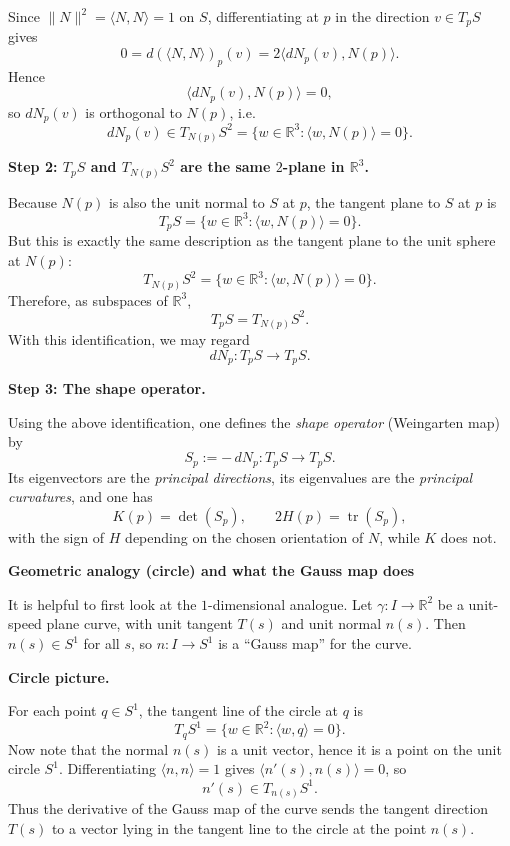 \begin{solution}
	Since $\|N\|^2=\langle N,N\rangle=1$ on $S$, differentiating at $p$ in the direction $v\in T_pS$
	gives
	\[
	0=d(\langle N,N\rangle)_p(v)=2\langle dN_p(v),N(p)\rangle.
	\]
	Hence
	\[
	\langle dN_p(v),N(p)\rangle=0,
	\]
	so $dN_p(v)$ is orthogonal to $N(p)$, i.e.
	\[
	dN_p(v)\in T_{N(p)}S^2=\{w\in\mathbb R^3:\langle w,N(p)\rangle=0\}.
	\]
	
	\par\medskip\noindent\textbf{Step 2: $T_pS$ and $T_{N(p)}S^2$ are the same $2$-plane in $\mathbb R^3$.}\par\smallskip

	Because $N(p)$ is also the unit normal to $S$ at $p$, the tangent plane to $S$ at $p$ is
	\[
	T_pS=\{w\in\mathbb R^3:\langle w,N(p)\rangle=0\}.
	\]
	But this is exactly the same description as the tangent plane to the unit sphere at $N(p)$:
	\[
	T_{N(p)}S^2=\{w\in\mathbb R^3:\langle w,N(p)\rangle=0\}.
	\]
	Therefore, as subspaces of $\mathbb R^3$,
	\[
	T_pS = T_{N(p)}S^2.
	\]
	With this identification, we may regard
	\[
	dN_p:T_pS\to T_pS.
	\]
	
	\par\medskip\noindent\textbf{Step 3: The shape operator.}\par\smallskip

	Using the above identification, one defines the \emph{shape operator} (Weingarten map) by
	\[
	S_p:=-\,dN_p:T_pS\to T_pS.
	\]
	Its eigenvectors are the \emph{principal directions}, its eigenvalues are the \emph{principal curvatures},
	and one has
	\[
	K(p)=\det(S_p),\qquad 2H(p)=\operatorname{tr}(S_p),
	\]
	with the sign of $H$ depending on the chosen orientation of $N$, while $K$ does not.
	
	\par\medskip\noindent\textbf{Geometric analogy (circle) and what the Gauss map does}\par\smallskip

	
	It is helpful to first look at the $1$-dimensional analogue.
	Let $\gamma:I\to\mathbb R^2$ be a unit-speed plane curve, with unit tangent $T(s)$ and unit normal $n(s)$.
	Then $n(s)\in S^1$ for all $s$, so $n:I\to S^1$ is a ``Gauss map'' for the curve.
	
	\par\medskip\noindent\textbf{Circle picture.}\par\smallskip

	For each point $q\in S^1$, the tangent line of the circle at $q$ is
	\[
	T_qS^1=\{w\in\mathbb R^2:\langle w,q\rangle=0\}.
	\]
	Now note that the normal $n(s)$ is a unit vector, hence it is a point on the unit circle $S^1$.
	Differentiating $\langle n,n\rangle=1$ gives $\langle n'(s),n(s)\rangle=0$, so
	\[
	n'(s)\in T_{n(s)}S^1.
	\]
	Thus the derivative of the Gauss map of the curve sends the tangent direction $T(s)$ to a vector
	lying in the tangent line to the circle at the point $n(s)$.
	

\end{solution}
